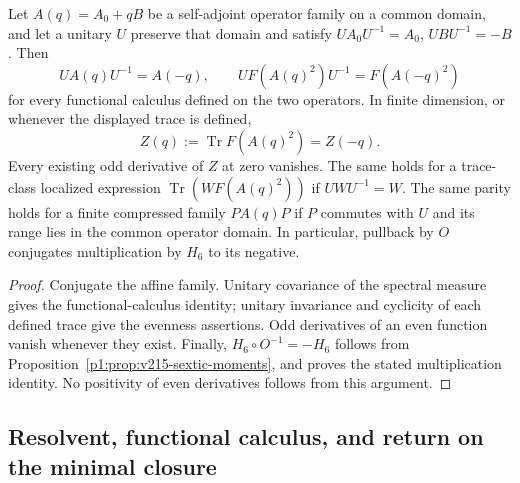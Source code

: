 \documentclass[11pt]{article}
\begin{document}
\begin{theorem}
\label{p1:thm:v215-odd-profile-spectral-parity}
Let \(A(q)=A_0+qB\) be a self-adjoint operator family on a common
domain, and let a unitary \(U\) preserve that domain and satisfy
\(UA_0U^{-1}=A_0\), \(UBU^{-1}=-B\). Then
\[
 UA(q)U^{-1}=A(-q),\qquad
 U F(A(q)^2)U^{-1}=F(A(-q)^2)
\]
for every functional calculus defined on the two operators. In finite
dimension, or whenever the displayed trace is defined,
\[
 Z(q):=\operatorname{Tr}F(A(q)^2)=Z(-q).
\]
Every existing odd derivative of \(Z\) at zero vanishes. The same
holds for a trace-class localized expression
\(\operatorname{Tr}(W F(A(q)^2))\) if \(UWU^{-1}=W\). The same parity
holds for a finite compressed family \(PA(q)P\) if \(P\) commutes with
\(U\) and its range lies in the common operator domain. In particular,
pullback by \(O\) conjugates multiplication by \(H_6\) to its negative.
\end{theorem}
\begin{proof}
Conjugate the affine family. Unitary covariance of the spectral measure
gives the functional-calculus identity; unitary invariance and cyclicity
of each defined trace give the evenness assertions. Odd derivatives of
an even function vanish whenever they exist. Finally,
\(H_6\circ O^{-1}=-H_6\) follows from
Proposition~\ref{p1:prop:v215-sextic-moments}, and proves the stated
multiplication identity. No positivity of even derivatives follows from
this argument.
\end{proof}

\subsection{Resolvent, functional calculus, and return on the minimal closure}
\label{p1:sec:v215-closure-return}
\end{document}
